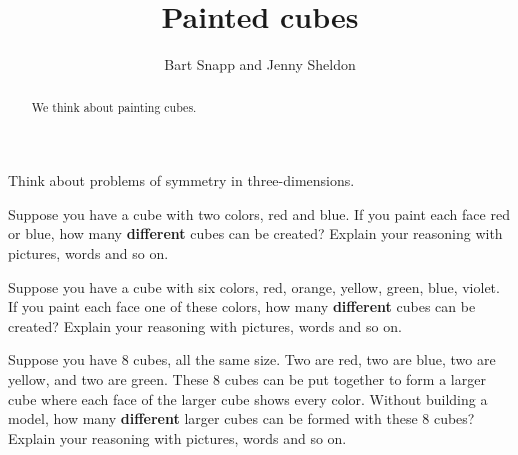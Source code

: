 \documentclass[noauthor,nooutcomes,hints,handout]{ximera}
\title{Painted cubes}
\author{Bart Snapp and Jenny Sheldon}
\begin{document}
\begin{abstract}
  We think about painting cubes.
\end{abstract}
\maketitle

\begin{listOutcomes}
\item Think about problems of symmetry in three-dimensions.
\end{listOutcomes}
\mynewpage


\begin{question}
  Suppose you have a cube with two colors, red and blue. If you paint
  each face red or blue, how many \textbf{different} cubes can be created?
  Explain your reasoning with pictures, words and so on.
\end{question}
\mynewpage



\begin{question}
  Suppose you have a cube with six colors, red, orange, yellow, green,
  blue, violet. If you paint each face one of these colors, how many
  \textbf{different} cubes can be created?  Explain your reasoning with
  pictures, words and so on.
\end{question}
\mynewpage



\begin{question}
  Suppose you have $8$ cubes, all the same size. Two are red, two are
  blue, two are yellow, and two are green. These 8 cubes can be put
  together to form a larger cube where each face of the larger cube
  shows every color. Without building a model, how many
  \textbf{different} larger cubes can be formed with these $8$ cubes?
  Explain your reasoning with pictures, words and so on.
\end{question}
\end{document}
